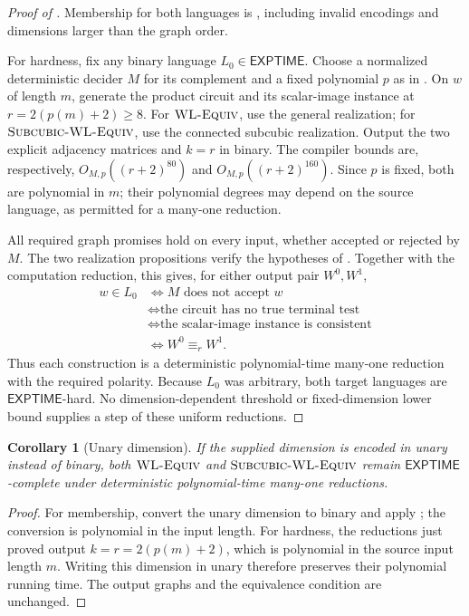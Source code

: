 \documentclass[11pt]{article}
\newtheorem{corollary}[theorem]{Corollary}
\theoremstyle{definition}
\newcommand{\EXPTIME}{\mathsf{EXPTIME}}
\newcommand{\WL}{\textnormal{\textsc{WL-Equiv}}}
\newcommand{\SubWL}{\textnormal{\textsc{Subcubic-WL-Equiv}}}
\begin{document}
\begin{proof}[Proof of ]
Membership for both languages is , including
invalid encodings and dimensions larger than the graph order.

For hardness, fix any binary language \(L_0\in\EXPTIME\).
Choose a normalized deterministic decider \(M\) for its complement
and a fixed polynomial \(p\) as in .
On \(w\) of length \(m\), generate the product circuit and its
scalar-image instance at \(r=2(p(m)+2)\ge8\). For \(\WL\), use
the general realization; for \(\SubWL\), use the connected subcubic
realization. Output the two explicit adjacency matrices and \(k=r\)
in binary. The compiler bounds are, respectively,
\(O_{M,p}((r+2)^{80})\) and \(O_{M,p}((r+2)^{160})\).
Since \(p\) is fixed, both are polynomial in \(m\); their polynomial
degrees may depend on the source language, as permitted for a
many-one reduction.

All required graph promises hold on every input, whether accepted
or rejected by \(M\). The two realization propositions verify the
hypotheses of . Together with the computation
reduction, this gives, for either output pair \(W^0,W^1\),
\[
\begin{aligned}
 w\in L_0
 &\Longleftrightarrow M\text{ does not accept }w\\
 &\Longleftrightarrow \text{the circuit has no true terminal test}\\
 &\Longleftrightarrow \text{the scalar-image instance is consistent}\\
 &\Longleftrightarrow W^0\equiv_r W^1.
\end{aligned}
\]
Thus each construction is a deterministic polynomial-time many-one
reduction with the required polarity. Because \(L_0\) was arbitrary,
both target languages are \(\EXPTIME\)-hard. No dimension-dependent
threshold or fixed-dimension lower bound supplies a step of these
uniform reductions.
\end{proof}


\begin{corollary}[Unary dimension]\label{cor:unary-dimension}
If the supplied dimension is encoded in unary instead of binary,
both \(\WL\) and \(\SubWL\) remain \(\EXPTIME\)-complete under
deterministic polynomial-time many-one reductions.
\end{corollary}

\begin{proof}
For membership, convert the unary dimension to binary and apply
; the conversion is polynomial in the input length.
For hardness, the reductions just proved output
\(k=r=2(p(m)+2)\), which is polynomial in the source input length \(m\).
Writing this dimension in unary therefore preserves their polynomial
running time. The output graphs and the equivalence condition are
unchanged.
\end{proof}



\end{document}
